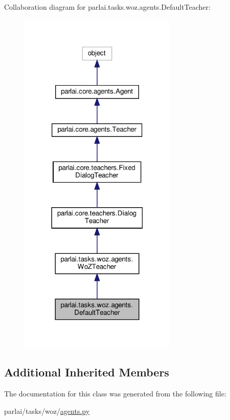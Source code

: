 Collaboration diagram for parlai.\+tasks.\+woz.\+agents.\+Default\+Teacher\+:
\nopagebreak
\begin{figure}[H]
\begin{center}
\leavevmode
\includegraphics[width=213pt]{classparlai_1_1tasks_1_1woz_1_1agents_1_1DefaultTeacher__coll__graph}
\end{center}
\end{figure}
\subsection*{Additional Inherited Members}


The documentation for this class was generated from the following file\+:\begin{DoxyCompactItemize}
\item 
parlai/tasks/woz/\hyperlink{parlai_2tasks_2woz_2agents_8py}{agents.\+py}\end{DoxyCompactItemize}
